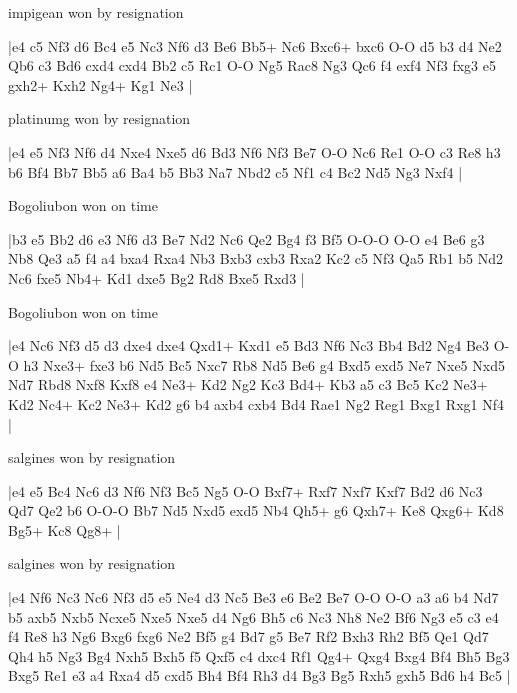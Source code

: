 \showboard

impigean won by resignation

\makegametitle
|e4 c5 Nf3 d6 Bc4 e5 Nc3 Nf6 d3 Be6 Bb5+ Nc6 Bxc6+ bxc6 O-O d5 b3 d4 Ne2 Qb6 c3 Bd6 cxd4 cxd4 Bb2 c5 Rc1 O-O Ng5 Rac8 Ng3 Qc6 f4 exf4 Nf3 fxg3 e5 gxh2+ Kxh2 Ng4+ Kg1 Ne3  |

\showboard

platinumg won by resignation

\makegametitle
|e4 e5 Nf3 Nf6 d4 Nxe4 Nxe5 d6 Bd3 Nf6 Nf3 Be7 O-O Nc6 Re1 O-O c3 Re8 h3 b6 Bf4 Bb7 Bb5 a6 Ba4 b5 Bb3 Na7 Nbd2 c5 Nf1 c4 Bc2 Nd5 Ng3 Nxf4  |

\showboard

Bogoliubon won on time

\makegametitle
|b3 e5 Bb2 d6 e3 Nf6 d3 Be7 Nd2 Nc6 Qe2 Bg4 f3 Bf5 O-O-O O-O e4 Be6 g3 Nb8 Qe3 a5 f4 a4 bxa4 Rxa4 Nb3 Bxb3 cxb3 Rxa2 Kc2 c5 Nf3 Qa5 Rb1 b5 Nd2 Nc6 fxe5 Nb4+ Kd1 dxe5 Bg2 Rd8 Bxe5 Rxd3  |

\showboard

Bogoliubon won on time

\makegametitle
|e4 Nc6 Nf3 d5 d3 dxe4 dxe4 Qxd1+ Kxd1 e5 Bd3 Nf6 Nc3 Bb4 Bd2 Ng4 Be3 O-O h3 Nxe3+ fxe3 b6 Nd5 Bc5 Nxc7 Rb8 Nd5 Be6 g4 Bxd5 exd5 Ne7 Nxe5 Nxd5 Nd7 Rbd8 Nxf8 Kxf8 e4 Ne3+ Kd2 Ng2 Kc3 Bd4+ Kb3 a5 c3 Bc5 Kc2 Ne3+ Kd2 Nc4+ Kc2 Ne3+ Kd2 g6 b4 axb4 cxb4 Bd4 Rae1 Ng2 Reg1 Bxg1 Rxg1 Nf4  |

\showboard

salgines won by resignation

\makegametitle
|e4 e5 Bc4 Nc6 d3 Nf6 Nf3 Bc5 Ng5 O-O Bxf7+ Rxf7 Nxf7 Kxf7 Bd2 d6 Nc3 Qd7 Qe2 b6 O-O-O Bb7 Nd5 Nxd5 exd5 Nb4 Qh5+ g6 Qxh7+ Ke8 Qxg6+ Kd8 Bg5+ Kc8 Qg8+  |

\showboard

salgines won by resignation

\makegametitle
|e4 Nf6 Nc3 Nc6 Nf3 d5 e5 Ne4 d3 Nc5 Be3 e6 Be2 Be7 O-O O-O a3 a6 b4 Nd7 b5 axb5 Nxb5 Ncxe5 Nxe5 Nxe5 d4 Ng6 Bh5 c6 Nc3 Nh8 Ne2 Bf6 Ng3 e5 c3 e4 f4 Re8 h3 Ng6 Bxg6 fxg6 Ne2 Bf5 g4 Bd7 g5 Be7 Rf2 Bxh3 Rh2 Bf5 Qe1 Qd7 Qh4 h5 Ng3 Bg4 Nxh5 Bxh5 f5 Qxf5 c4 dxc4 Rf1 Qg4+ Qxg4 Bxg4 Bf4 Bh5 Bg3 Bxg5 Re1 e3 a4 Rxa4 d5 cxd5 Bh4 Bf4 Rh3 d4 Bg3 Bg5 Rxh5 gxh5 Bd6 h4 Bc5  |

